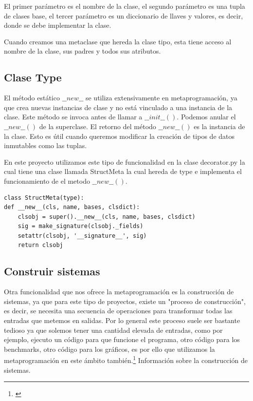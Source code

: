 \documentclass{cosas/tfg_domingo}
\begin{document}
El primer parámetro es el nombre de la clase, el segundo parámetro es una tupla de clases base, el tercer parámetro es un diccionario de llaves y valores, es decir, donde se debe implementar la clase.

Cuando creamos una metaclase que hereda la clase tipo, esta tiene acceso al nombre de la clase, sus padres y todos sus atributos.


\subsection{Clase Type}
El método estático $\_\_new\_\_$ se utiliza extensivamente en metaprogramación, ya que crea nuevas instancias de clase y no está vinculado a una instancia de la clase. Este método se invoca antes de llamar a $\_\_init\_\_()$. Podemos anular el $\_\_new\_\_()$ de la superclase.
El retorno del método $\_\_new\_\_()$ es la instancia de la clase. Esto es útil cuando queremos modificar la creación de tipos de datos inmutables como las tuplas.

En este proyecto utilizamos este tipo de funcionalidad en la clase decorator.py la cual tiene una clase llamada StructMeta la cual hereda de type e implementa el funcionamiento de el metodo $\_\_new\_\_()$.
\begin{verbatim}
class StructMeta(type):
def __new__(cls, name, bases, clsdict):
    clsobj = super().__new__(cls, name, bases, clsdict)
    sig = make_signature(clsobj._fields)
    setattr(clsobj, '__signature__', sig)
    return clsobj
\end{verbatim}



\subsection{Construir sistemas}
Otra funcionalidad que nos ofrece la metaprogramación es la construcción de sistemas, ya que para este tipo de proyectos, existe un "proceso de construcción", es decir, se necesita una secuencia de operaciones para transformar todas las entradas que metemos en salidas. Por lo general este proceso suele ser bastante tedioso ya que solemos tener una cantidad elevada de entradas, como por ejemplo, ejecuto un código para que funcione el programa, otro código para los benchmarks, otro código para los gráficos, es por ello que utilizamos la metaprogramación en este ámbito también.\footnote{\citep{metaprogramming}} Información sobre la construcción de sistemas.
\end{document}
